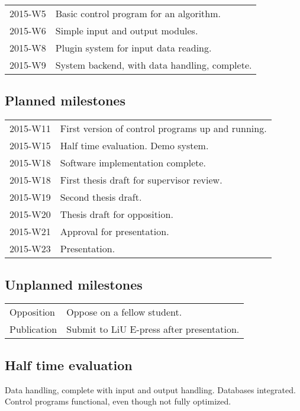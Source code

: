 \documentclass[11pt]{article}
\begin{document}
\begin{tabular}{l l}
    2015-W5     & Basic control program for an algorithm.  \\
    2015-W6     & Simple input and output modules.  \\
    2015-W8     & Plugin system for input data reading.  \\
    2015-W9     & System backend, with data handling, complete.  \\
\end{tabular}

\subsection*{Planned milestones}

\begin{tabular}{l l}
    2015-W11    & First version of control programs up and running. \\
    2015-W15    & Half time evaluation. Demo system. \\
    2015-W18    & Software implementation complete. \\
    2015-W18    & First thesis draft for supervisor review. \\
    2015-W19    & Second thesis draft. \\
    2015-W20    & Thesis draft for opposition. \\
    2015-W21    & Approval for presentation. \\
    2015-W23    & Presentation. \\
\end{tabular}

\subsection*{Unplanned milestones}

\begin{tabular}{l l}
    Opposition  & Oppose on a fellow student. \\
    Publication  & Submit to LiU E-press after presentation. \\
\end{tabular}

\subsection*{Half time evaluation}

Data handling, complete with input and output handling. Databases integrated. Control programs functional, even though not fully optimized.
\end{document}
